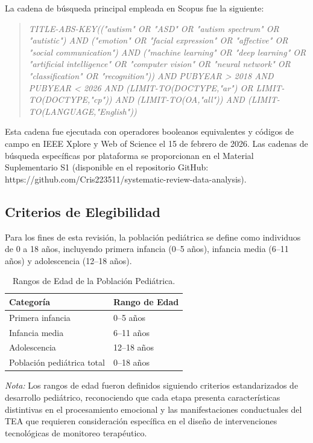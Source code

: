 \documentclass[3p,twocolumn,times]{elsarticle}
\begin{document}
	La cadena de búsqueda principal empleada en Scopus fue la siguiente:
	
	\begin{quote}
		\small\textit{TITLE-ABS-KEY(("autism" OR "ASD" OR "autism spectrum" OR "autistic")
			AND ("emotion" OR "facial expression" OR "affective" OR "social communication")
			AND ("machine learning" OR "deep learning" OR "artificial intelligence" OR
			"computer vision" OR "neural network" OR "classification" OR "recognition"))
			AND PUBYEAR > 2018 AND PUBYEAR < 2026 AND (LIMIT-TO(DOCTYPE,"ar") OR
			LIMIT-TO(DOCTYPE,"cp")) AND (LIMIT-TO(OA,"all")) AND
			(LIMIT-TO(LANGUAGE,"English"))}
	\end{quote}
	
	Esta cadena fue ejecutada con operadores booleanos equivalentes y códigos de
	campo en IEEE Xplore y Web of Science el 15 de febrero de 2026. Las cadenas de
	búsqueda específicas por plataforma se proporcionan en el Material Suplementario
	S1 (disponible en el repositorio GitHub:
	https://github.com/Cris223511/systematic-review-data-analysis).
	
	\subsection{Criterios de Elegibilidad}\label{sec2d}
	
	Para los fines de esta revisión, la población pediátrica se define como
	individuos de 0 a 18 años, incluyendo primera infancia (0--5 años), infancia
	media (6--11 años) y adolescencia (12--18 años).
	
	\begin{table}[t]
		\centering
		\caption{Rangos de Edad de la Población Pediátrica.}\label{tab2}
		\begin{tabular}{ll}
			\toprule
			\textbf{Categoría} & \textbf{Rango de Edad} \\
			\midrule
			Primera infancia           & 0--5 años  \\
			Infancia media             & 6--11 años \\
			Adolescencia               & 12--18 años \\
			Población pediátrica total & 0--18 años \\
			\bottomrule
		\end{tabular}
		\begin{minipage}{\columnwidth}
			\vspace{6pt}
			\small\textit{Nota:} Los rangos de edad fueron definidos siguiendo criterios estandarizados
			de desarrollo pediátrico, reconociendo que cada etapa presenta características
			distintivas en el procesamiento emocional y las manifestaciones conductuales del
			TEA que requieren consideración específica en el diseño de intervenciones
			tecnológicas de monitoreo terapéutico.
		\end{minipage}
	\end{table}
	
\end{document}

